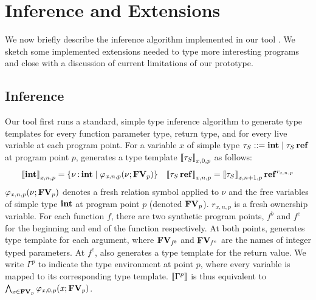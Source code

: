 \section{Inference and Extensions}
\label{sec:infr}
We now briefly describe the inference algorithm implemented in
our tool \name. We sketch some implemented extensions needed to type more
interesting programs and close with a discussion of current
limitations of our prototype.

\subsection{Inference}
Our tool first runs a standard, simple type inference
algorithm to generate type templates for every function parameter
type, return type, and for every live variable at each program point.
For a variable $x$ of simple type $\tau_{S} ::=  \mathbf{int}  \mid  \tau_{S}  \operatorname{\mathbf{ref}} $
at program point $p$, \name generates a type template $ \left\llbracket{ \tau_{S} }\right\rrbracket_{ \mathit{x} , 0 , p } $
as follows:
\begin{align*}
   \left\llbracket{  \mathbf{int}}\right\rrbracket_{ \mathit{x} , n , p }  =  \left\{{  \nu  \operatorname{:} \mathbf{int} \mid    \varphi _{ \mathit{x} , n , p }  ( \nu ;   \mathbf{FV} _{ p }  )  }\right\}  &&  \left\llbracket{  \tau_{S}  \operatorname{\mathbf{ref}}}\right\rrbracket_{ \mathit{x} , n , p }  =   \left\llbracket{ \tau_{S} }\right\rrbracket_{ \mathit{x} , n  +  1 , p }   \operatorname{\mathbf{ref}}^{  r _{ \mathit{x} , n , p }  } 
\end{align*}
$  \varphi _{ \mathit{x} , n , p }  ( \nu ;   \mathbf{FV} _{ p }  ) $ denotes a fresh relation symbol
applied to $\nu$ and the free variables of simple type $ \mathbf{int} $
at program point $p$ (denoted $ \mathbf{FV} _{ p } $). $ r _{ \mathit{x} , n , p } $ is a
fresh ownership variable. For each function $\mathit{f}$,
there are two synthetic program points, $ { \mathit{f} ^{b} } $ and $ { \mathit{f} ^{e} } $
for the beginning and end of the function respectively.
At both points, \name generates type template for each argument, where $ \mathbf{FV} _{  { \mathit{f} ^{b} }  } $
and $ \mathbf{FV} _{  { \mathit{f} ^{e} }  } $ are the names of integer typed parameters.
At $ { \mathit{f} ^{e} } $, \name also generates a type template for the return
value.
We write $ \Gamma ^ p $ to indicate the type environment at point $p$,
where every variable is mapped to its corresponding type template.
$ \left\llbracket{  \Gamma ^ p  }\right\rrbracket $ is thus equivalent to
$ \bigwedge_{  \mathit{x}  \in   \mathbf{FV} _{ p }   }    \varphi _{ \mathit{x} , 0 , p }  ( \mathit{x} ;   \mathbf{FV} _{ p }  )  $.


